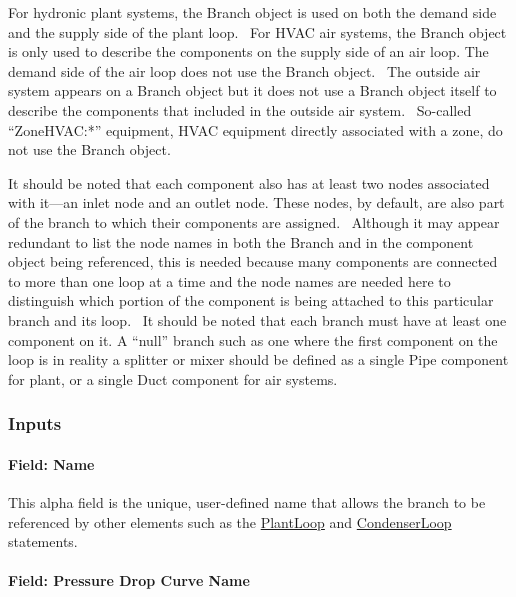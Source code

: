 For hydronic plant systems, the Branch object is used on both the demand side and the supply side of the plant loop.~ For HVAC air systems, the Branch object is only used to describe the components on the supply side of an air loop. The demand side of the air loop does not use the Branch object.~ The outside air system appears on a Branch object but it does not use a Branch object itself to describe the components that included in the outside air system.~ So-called ``ZoneHVAC:*'' equipment, HVAC equipment directly associated with a zone, do not use the Branch object.

It should be noted that each component also has at least two nodes associated with it---an inlet node and an outlet node. These nodes, by default, are also part of the branch to which their components are assigned.~ Although it may appear redundant to list the node names in both the Branch and in the component object being referenced, this is needed because many components are connected to more than one loop at a time and the node names are needed here to distinguish which portion of the component is being attached to this particular branch and its loop.~ It should be noted that each branch must have at least one component on it. A ``null'' branch such as one where the first component on the loop is in reality a splitter or mixer should be defined as a single Pipe component for plant, or a single Duct component for air systems.

\subsubsection{Inputs}\label{inputs-2-023}

\paragraph{Field: Name}\label{field-name-2-022}

This alpha field is the unique, user-defined name that allows the branch to be referenced by other elements such as the \hyperref[plantloop]{PlantLoop} and \hyperref[condenserloop]{CondenserLoop} statements.

\paragraph{Field: Pressure Drop Curve Name}\label{field-pressure-drop-curve-name}


